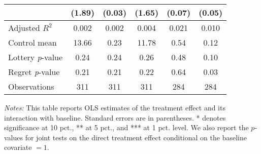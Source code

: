 \begin{table}[ht]
{\begin{threeparttable}
\begin{tabular}{l*{5}{c}}
                &   (1.89)         &   (0.03)         &   (1.65)         &   (0.07)         &   (0.05)         \\
\midrule
Adjusted \(R^{2}\)&    0.002         &    0.002         &    0.004         &    0.021         &    0.010         \\
Control mean    &    13.66         &     0.23         &    11.78         &     0.54         &     0.12         \\
Lottery \emph{p}-value&     0.24         &     0.24         &     0.26         &     0.48         &     0.10         \\
Regret \emph{p}-value&     0.21         &     0.21         &     0.22         &     0.64         &     0.03         \\
Observations    &      311         &      311         &      311         &      284         &      284         \\
\bottomrule \end{tabular} \begin{tablenotes}[flushleft] \footnotesize \item \emph{Notes:} This table reports OLS estimates of the treatment effect and its interaction with baseline. Standard errors are in parentheses. * denotes significance at 10 pct., ** at 5 pct., and *** at 1 pct. level. We also report the \(p\)-values for joint tests on the direct treatment effect conditional on the baseline covariate $= 1$. \end{tablenotes} \end{threeparttable} } \end{table}

